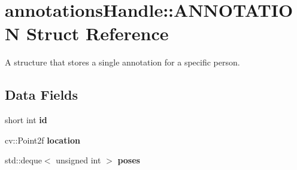\hypertarget{structannotationsHandle_1_1ANNOTATION}{
\section{annotationsHandle::ANNOTATION Struct Reference}
\label{structannotationsHandle_1_1ANNOTATION}
}


A structure that stores a single annotation for a specific person.  


\subsection*{Data Fields}
\begin{DoxyCompactItemize}
\item 
\hypertarget{structannotationsHandle_1_1ANNOTATION_a4ddebd766a76758ce4466a465aeed90b}{
short int {\bfseries id}}
\label{structannotationsHandle_1_1ANNOTATION_a4ddebd766a76758ce4466a465aeed90b}

\item 
\hypertarget{structannotationsHandle_1_1ANNOTATION_a3d1bcc15c6650f45dda33039bcdc56a5}{
cv::Point2f {\bfseries location}}
\label{structannotationsHandle_1_1ANNOTATION_a3d1bcc15c6650f45dda33039bcdc56a5}

\item 
\hypertarget{structannotationsHandle_1_1ANNOTATION_a68aae743725ede2ec2676aba44a1aa94}{
std::deque$<$ unsigned int $>$ {\bfseries poses}}
\label{structannotationsHandle_1_1ANNOTATION_a68aae743725ede2ec2676aba44a1aa94}

\end{DoxyCompactItemize}
